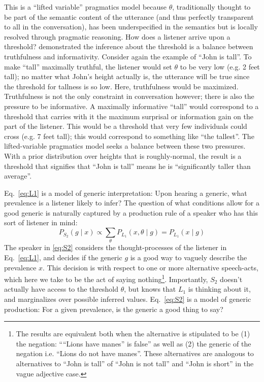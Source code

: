 \documentclass[10pt,letterpaper]{article}
\begin{document}
This is a ``lifted variable'' pragmatics model because $\theta$, traditionally thought to be part of the semantic content of the utterance (and thus perfectly transparent to all in the conversation), has been underspecified in the semantics but is locally resolved through pragmatic reasoning.
How does a listener arrive upon a threshold? 
 demonstrated the inference about the threshold is a balance between truthfulness and informativity. 
Consider again the example of ``John is tall''. 
To make ``tall'' maximally truthful, the listener would set $\theta$ to be very low (e.g. 2 feet tall); no matter what John's height actually is, the utterance will be true since the threshold for tallness is so low. Here, truthfulness would be maximized. 
 Truthfulness is not the only constraint in conversation however; there is also the pressure to be informative. 
 A maximally informative ``tall'' would correspond to a threshold that carries with it the maximum surprisal or information gain on the part of the listener. 
 This would be a threshold that very few individuals could cross (e.g. 7 feet tall); this would correspond to something like ``the tallest''. 
 The lifted-variable pragmatics model seeks a balance between these two pressures. 
With a prior distribution over heights that is roughly-normal, the result is a threshold that signifies that ``John is tall'' means he is ``significantly taller than average''.
 
Eq.~\ref{eq:L1} is a model of generic interpretation: Upon hearing a generic, what prevalence is a listener likely to infer?
The question of what conditions allow for a good generic is naturally captured by a production rule of a speaker who has this sort of listener in mind:
\begin{equation} 
P_{S_{2}}(g \mid x) \propto  \sum_{\theta} P_{L_{1}}(x , \theta \mid g) =  P_{L_{1}}(x \mid g)
\label{eq:S2}
\end{equation}
%
The speaker in \eqref{eq:S2} considers the thought-processes of the listener in Eq.~\eqref{eq:L1}, and decides if the generic $g$ is a good way to vaguely describe the prevalence $x$. 
This decision is with respect to one or more alternative speech-acts, which here we take to be the act of saying nothing\footnote{The results are equivalent both when the alternative is stipulated to be (1) the negation:  ````Lions have manes'' is false'' as well as (2) the generic of the negation i.e. ``Lions do not have manes''. These alternatives are analogous to alternatives to ``John is tall'' of ``John is not tall'' and ``John is short'' in the vague adjective case.}. 
Importantly, $S_{2}$ doesn't actually have access to the threshold $\theta$, but knows that $L_{1}$ is thinking about it, and marginalizes over possible inferred values. 
Eq.~\eqref{eq:S2} is a model of generic production: For a given prevalence, is the generic a good thing to say?
\end{document}
